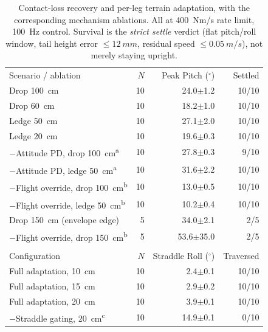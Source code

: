 \documentclass[a4paper,fleqn]{cas-dc}
\begin{document}
\begin{table}[pos=!tbp]
\centering
\caption{Contact-loss recovery and per-leg terrain adaptation, with the
corresponding mechanism ablations. All at \SI{400}{Nm/s} rate limit,
\SI{100}{Hz} control. Survival is the \emph{strict settle} verdict (flat
pitch/roll window, tail height error ${\leq}\SI{12}{mm}$, residual speed
${\leq}\SI{0.05}{m/s}$), not merely staying upright.}
\label{tab:flight_ext}
\footnotesize
\setlength{\tabcolsep}{4pt}
\begin{tabular}{@{}>{\raggedright\arraybackslash}p{3.5cm}rrr@{}}
\toprule
\multicolumn{4}{c}{\textbf{Contact-Loss Recovery}} \\
\midrule
Scenario / ablation & $N$ & Peak Pitch ($^\circ$) & Settled \\
\addlinespace
Drop \SI{100}{cm}    & 10 & 24.0$\pm$1.2 & 10/10 \\
Drop \SI{60}{cm}     & 10 & 18.2$\pm$1.0 & 10/10 \\
Ledge \SI{50}{cm}    & 10 & 27.1$\pm$2.0 & 10/10 \\
Ledge \SI{20}{cm}    & 10 & 19.6$\pm$0.3 & 10/10 \\
\addlinespace[1pt]
$-$Attitude PD, drop \SI{100}{cm}\textsuperscript{a}   & 10 & 27.8$\pm$0.3 & 9/10 \\
$-$Attitude PD, ledge \SI{50}{cm}\textsuperscript{a}   & 10 & 31.6$\pm$2.2 & 10/10 \\
$-$Flight override, drop \SI{100}{cm}\textsuperscript{b} & 10 & 13.0$\pm$0.5 & 10/10 \\
$-$Flight override, ledge \SI{50}{cm}\textsuperscript{b} & 10 & 10.2$\pm$0.4 & 10/10 \\
\addlinespace[1pt]
Drop \SI{150}{cm} (envelope edge)      & 5 & 34.0$\pm$2.1 & 2/5 \\
$-$Flight override, drop \SI{150}{cm}\textsuperscript{b} & 5 & 53.6$\pm$35.0 & 2/5 \\
\addlinespace
\multicolumn{4}{c}{\textbf{Per-Leg Terrain (One-Wheel Curb, \SI{0.15}{m/s})}} \\
\addlinespace
Configuration & $N$ & Straddle Roll ($^\circ$) & Traversed \\
\addlinespace
Full adaptation, \SI{10}{cm}  & 10 & 2.4$\pm$0.1 & 10/10 \\
Full adaptation, \SI{15}{cm}  & 10 & 2.9$\pm$0.2 & 10/10 \\
Full adaptation, \SI{20}{cm}  & 10 & 3.9$\pm$0.1 & 10/10 \\
\addlinespace[1pt]
$-$Straddle gating, \SI{20}{cm}\textsuperscript{c} & 10 & 14.9$\pm$0.1 & 0/10 \\

\end{tabular}
\end{table}
\end{document}
